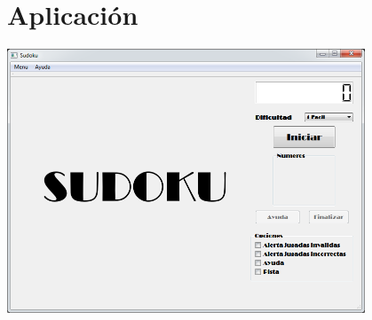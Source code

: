 \documentclass[12pt,oneside]{book}
\begin{document}
\chapter{Aplicación}
	\includegraphics[width=0.8\textwidth]{./imagenes/PantallaPrincipal.png}
\end{document}

